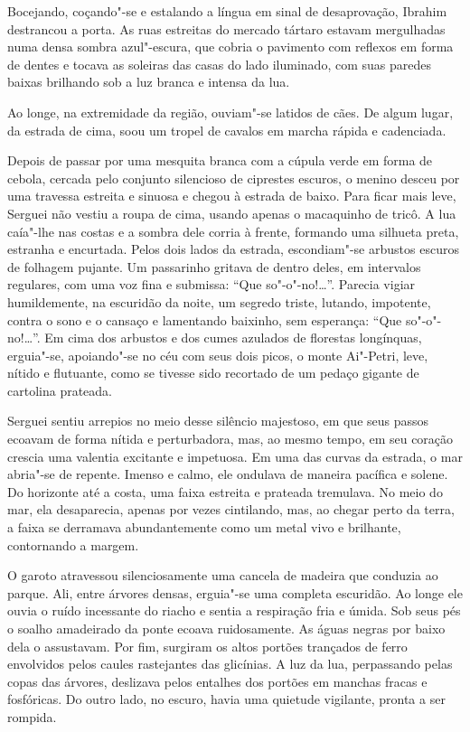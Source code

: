 Bocejando, coçando"-se e estalando a língua em sinal de desaprovação,
Ibrahim destrancou a porta. As ruas estreitas do mercado tártaro estavam
mergulhadas numa densa sombra azul"-escura, que cobria o pavimento com
reflexos em forma de dentes e tocava as soleiras das casas do lado
iluminado, com suas paredes baixas brilhando sob a luz branca e intensa
da lua.

Ao longe, na extremidade da região, ouviam"-se latidos de cães. De algum
lugar, da estrada de cima, soou um tropel de cavalos em marcha rápida e
cadenciada.

Depois de passar por uma mesquita branca com a cúpula verde em forma de
cebola, cercada pelo conjunto silencioso de ciprestes escuros, o menino
desceu por uma travessa estreita e sinuosa e chegou à estrada de baixo.
Para ficar mais leve, Serguei não vestiu a roupa de cima, usando apenas
o macaquinho de tricô. A lua caía"-lhe nas costas e a sombra dele corria
à frente, formando uma silhueta preta, estranha e encurtada. Pelos dois
lados da estrada, escondiam"-se arbustos escuros de folhagem pujante. Um
passarinho gritava de dentro deles, em intervalos regulares, com uma voz
fina e submissa: ``Que so"-o"-no!\ldots{}''. Parecia vigiar humildemente, na
escuridão da noite, um segredo triste, lutando, impotente, contra o sono
e o cansaço e lamentando baixinho, sem esperança: ``Que so"-o"-no!\ldots{}''. Em
cima dos arbustos e dos cumes azulados de florestas longínquas,
erguia"-se, apoiando"-se no céu com seus dois picos, o monte Ai"-Petri,
leve, nítido e flutuante, como se tivesse sido recortado de um pedaço
gigante de cartolina prateada.

Serguei sentiu arrepios no meio desse silêncio majestoso, em que seus
passos ecoavam de forma nítida e perturbadora, mas, ao mesmo tempo, em
seu coração crescia uma valentia excitante e impetuosa. Em uma das
curvas da estrada, o mar abria"-se de repente. Imenso e calmo, ele
ondulava de maneira pacífica e solene. Do horizonte até a costa, uma
faixa estreita e prateada tremulava. No meio do mar, ela desaparecia,
apenas por vezes cintilando, mas, ao chegar perto da terra, a faixa se
derramava abundantemente como um metal vivo e brilhante, contornando a
margem.

O garoto atravessou silenciosamente uma cancela de madeira que conduzia
ao parque. Ali, entre árvores densas, erguia"-se uma completa escuridão.
Ao longe ele ouvia o ruído incessante do riacho e sentia a respiração
fria e úmida. Sob seus pés o soalho amadeirado da ponte ecoava
ruidosamente. As águas negras por baixo dela o assustavam. Por fim,
surgiram os altos portões trançados de ferro envolvidos pelos caules
rastejantes das glicínias. A luz da lua, perpassando pelas copas das
árvores, deslizava pelos entalhes dos portões em manchas fracas e
fosfóricas. Do outro lado, no escuro, havia uma quietude vigilante,
pronta a ser rompida.

